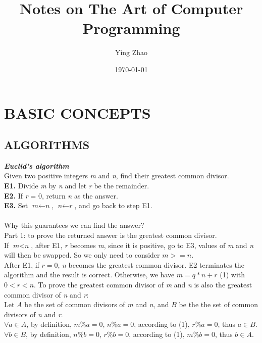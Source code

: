 \documentclass[11pt]{article}
\title{Notes on The Art of Computer Programming}
\author{ Ying Zhao }
\date{\today}
\begin{document}
\maketitle	
\pagebreak



\section{BASIC CONCEPTS}
\subsection{ALGORITHMS}
\textbf{\textit{Euclid's algorithm}}\\
Given two positive integers \textit{m} and \textit{n}, find their greatest common divisor.\\
\textbf{E1.} Divide \textit{m} by \textit{n} and let \textit{r} be the remainder.\\
\textbf{E2.} If \textit{r} = 0, return \textit{n} as the answer.\\
\textbf{E3.} Set $\textit{m} \leftarrow \textit{n}$, $\textit{n} \leftarrow \textit{r}$,  and go back to step E1.\\
\\
Why this guarantees we can find the answer?\\
Part 1: to prove the returned answer is the greatest common divisor.\\
If $\textit{m} < \textit{n}$, after E1, \textit{r} becomes \textit{m}, since it is positive, go to E3, values of \textit{m} and \textit{n} will then be swapped. So we only need to consider $\textit{m} >= \textit{n}$.\\
After E1, if $\textit{r} = 0$, \textit{n} becomes the greatest common divisor. E2 terminates the algorithm and the result is correct. Otherwise, we have $\textit{m} = q*n + r$ (1) with $0<r<n$. To prove the greatest common divisor of \textit{m} and \textit{n} is also the greatest common divisor of \textit{n} and \textit{r}:\\
Let $A$ be the set of common divisors of \textit{m} and \textit{n}, and $B$ be the the set of common divisors of \textit{n} and \textit{r}.\\
$\forall a \in A$, by definition, $m\%a = 0$, $n\%a = 0$, according to (1), $r\%a = 0$, thus $a \in B$.\\
$\forall b \in B$, by definition, $n\%b = 0$, $r\%b = 0$, according to (1), $m\%b = 0$, thus $b \in A$.\\
\end{document}
